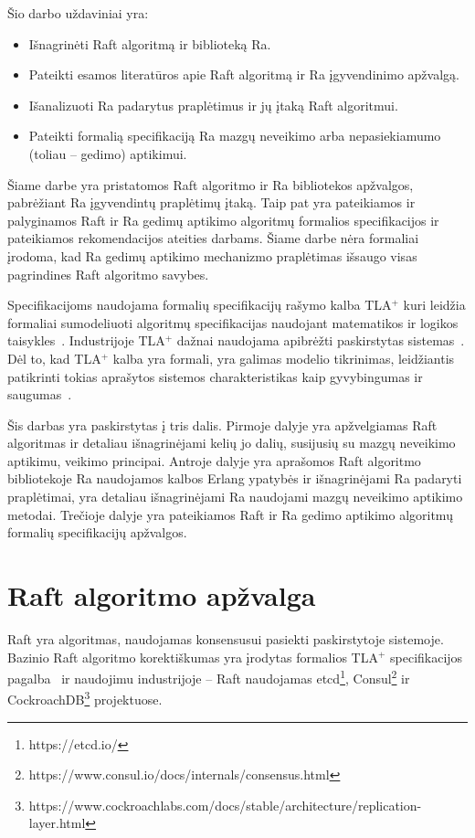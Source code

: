 \documentclass{VUMIFPSkursinis}
\begin{document}
Šio darbo uždaviniai yra:
\begin{itemize}
\item Išnagrinėti Raft algoritmą ir biblioteką Ra.
\item Pateikti esamos literatūros apie Raft algoritmą ir Ra įgyvendinimo apžvalgą.
\item Išanalizuoti Ra padarytus praplėtimus ir jų įtaką Raft algoritmui.
\item Pateikti formalią specifikaciją Ra mazgų neveikimo arba nepasiekiamumo (toliau -- gedimo) aptikimui.
\end{itemize}

Šiame darbe yra pristatomos Raft algoritmo ir Ra bibliotekos apžvalgos, pabrėžiant Ra įgyvendintų praplėtimų įtaką. Taip pat yra pateikiamos ir palyginamos Raft ir Ra gedimų aptikimo algoritmų formalios specifikacijos ir pateikiamos rekomendacijos ateities darbams. Šiame darbe nėra formaliai įrodoma, kad Ra gedimų aptikimo mechanizmo praplėtimas išsaugo visas pagrindines Raft algoritmo savybes.

Specifikacijoms naudojama formalių specifikacijų rašymo kalba TLA$^+$ kuri leidžia formaliai sumodeliuoti algoritmų specifikacijas naudojant matematikos ir logikos taisykles~\cite{lamport2002specifying}. Industrijoje TLA$^+$ dažnai naudojama apibrėžti paskirstytas sistemas~\cite{amazon_use_formal_methods}. Dėl to, kad TLA$^+$ kalba yra formali, yra galimas modelio tikrinimas, leidžiantis patikrinti tokias aprašytos sistemos charakteristikas kaip gyvybingumas ir saugumas~\cite{lamport2002specifying}.

Šis darbas yra paskirstytas į tris dalis. Pirmoje dalyje yra apžvelgiamas Raft algoritmas ir detaliau išnagrinėjami kelių jo dalių, susijusių su mazgų neveikimo aptikimu, veikimo principai. Antroje dalyje yra aprašomos Raft algoritmo bibliotekoje Ra naudojamos kalbos Erlang ypatybės ir išnagrinėjami Ra padaryti praplėtimai, yra detaliau išnagrinėjami Ra naudojami mazgų neveikimo aptikimo metodai. Trečioje dalyje yra pateikiamos Raft ir Ra gedimo aptikimo algoritmų formalių specifikacijų apžvalgos.

\section{Raft algoritmo apžvalga}

Raft yra algoritmas, naudojamas konsensusui pasiekti paskirstytoje sistemoje. Bazinio Raft algoritmo korektiškumas yra įrodytas formalios TLA$^+$ specifikacijos pagalba~\cite{ongaro_consensus} ir naudojimu industrijoje -- Raft naudojamas etcd\footnote{https://etcd.io/}, Consul\footnote{https://www.consul.io/docs/internals/consensus.html} ir CockroachDB\footnote{https://www.cockroachlabs.com/docs/stable/architecture/replication-layer.html} projektuose. 
\end{document}
